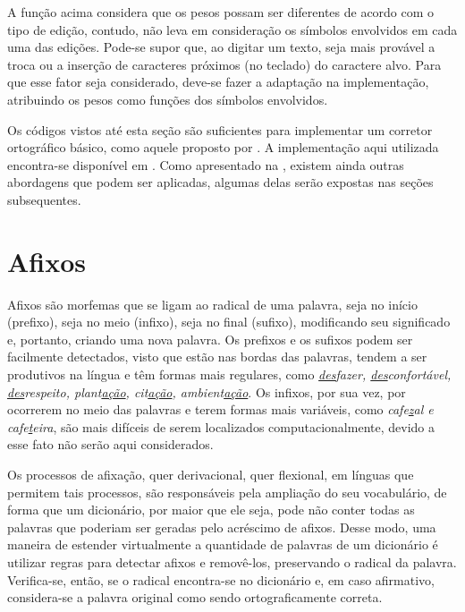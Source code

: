 \documentclass{textolivre}
\begin{document}
A função acima considera que os pesos possam ser diferentes de acordo
com o tipo de edição, contudo, não leva
em consideração os símbolos envolvidos em cada uma das edições.
Pode-se supor que, ao digitar um texto, seja mais provável a troca ou a inserção de caracteres próximos
(no teclado) do caractere alvo. Para que esse fator seja considerado, deve-se
fazer a adaptação na implementação, atribuindo os pesos como funções dos
símbolos envolvidos.

Os códigos vistos até esta seção são suficientes para implementar um corretor ortográfico 
básico, como aquele proposto por \textcite{norvig2007}. A implementação aqui utilizada
encontra-se disponível em \textcite{leolcaspell}.
Como apresentado na ,
existem ainda outras abordagens que podem ser aplicadas, algumas delas
serão expostas nas seções subsequentes.



\section{Afixos}\label{sec-afixos}

Afixos são morfemas que se ligam ao
radical de uma palavra, seja no início
(prefixo), seja no meio (infixo),
seja no final (sufixo),
modificando seu significado e, portanto,
criando uma nova palavra. Os
prefixos e os sufixos podem ser facilmente detectados, visto que estão nas bordas
das palavras, tendem a ser produtivos na língua e têm formas mais regulares,
como \textit{\underline{des}fazer, \underline{des}confortável, \underline{des}respeito, plant\underline{ação}, cit\underline{ação}, ambient\underline{ação}}. Os infixos, por sua vez,
por ocorrerem no meio das palavras e terem formas mais variáveis, como
\textit{cafe\underline{z}al e
cafe\underline{t}eira}, são mais difíceis
de serem localizados computacionalmente, devido a esse fato não serão aqui
considerados.

Os processos de afixação, quer derivacional, quer flexional, em
línguas que permitem tais processos,
são responsáveis pela ampliação do seu
vocabulário, de forma que um dicionário,
por maior que ele seja, pode não conter todas as palavras que poderiam ser geradas pelo acréscimo de
afixos. Desse modo, uma maneira de
estender virtualmente a quantidade de 
palavras de um
dicionário é utilizar regras para detectar afixos e 
removê-los, preservando o radical da
palavra. Verifica-se, então, se o
radical encontra-se no dicionário e,
em caso afirmativo, considera-se a
palavra original como sendo ortograficamente correta. 
\end{document}
